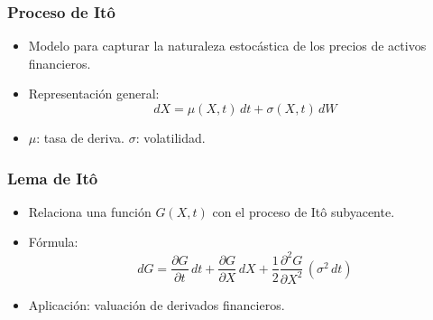 
\begin{frame}
    \frametitle{Proceso de Itô}
    \begin{itemize}
        \item Modelo para capturar la naturaleza estocástica de los precios de activos financieros.
        \item Representación general:
        \[dX = \mu(X, t) \, dt + \sigma(X, t) \, dW\]
        \item \(\mu\): tasa de deriva. \(\sigma\): volatilidad.
    \end{itemize}
\end{frame}


\begin{frame}
    \frametitle{Lema de Itô}
    \begin{itemize}
        \item Relaciona una función \(G(X, t)\) con el proceso de Itô subyacente.
        \item Fórmula:
        \[dG = \frac{\partial G}{\partial t} \, dt + \frac{\partial G}{\partial X} \, dX + \frac{1}{2} \frac{\partial^2 G}{\partial X^2} \, (\sigma^2 \, dt)\]
        \item Aplicación: valuación de derivados financieros.
    \end{itemize}
\end{frame}